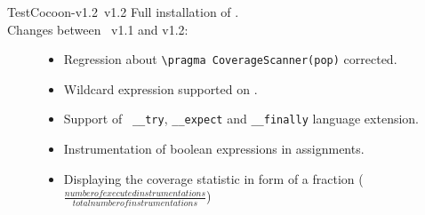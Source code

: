\begin{TestCocoonDownload}
\begin{TestCocoonDownloadLink}
\end{TestCocoonDownloadLink}
\begin{ReleaseNote}{TestCocoon-v1.2}{\TestCocoon\ v1.2}
Full installation of \TestCocoon.\\
Changes between \TestCocoon\ v1.1 and v1.2:
\begin{description}
\item[\CoverageScanner]
  \begin{itemize}
    \item \BugFix Regression about \verb$\pragma CoverageScanner(pop)$ corrected.
    \item \NewFeature Wildcard expression supported on \MicrosoftWindows.
    \item \BugFix Support of \VisualStudio\ \verb$__try$, \verb$__expect$ and \verb$__finally$ language extension.
    \item \NewFeature Instrumentation of boolean expressions in assignments.
  \end{itemize}
\item[\CoverageBrowser]
  \begin{itemize}
    \item \NewFeature Displaying the coverage statistic in form of a fraction ($\frac{number of executed instrumentations}{total number of instrumentations}$)
  \end{itemize}
%

\end{description}
\end{ReleaseNote}
\end{TestCocoonDownload}


